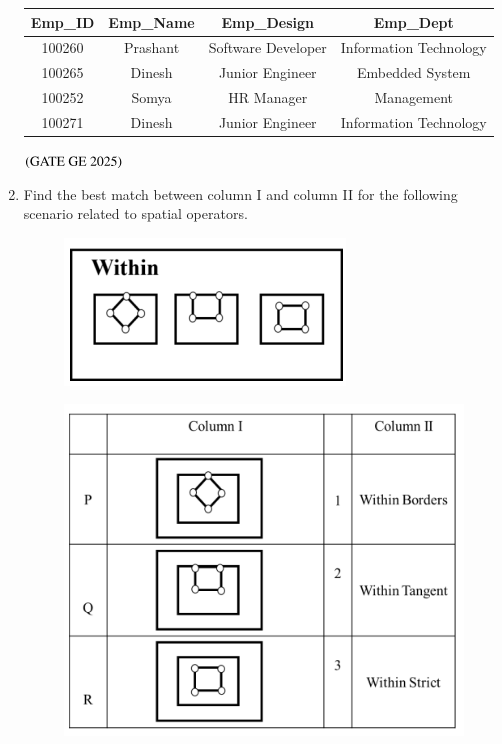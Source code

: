 \documentclass[journal,12pt,onecolumn]{IEEEtran}
\theoremstyle{remark}
\begin{document}
\begin{enumerate}
\begin{table}[h]
\centering
\begin{tabular}{|c|c|c|c|}
\hline
Emp\_ID & Emp\_Name & Emp\_Design & Emp\_Dept \\
\hline
100260 & Prashant & Software Developer & Information Technology \\
100265 & Dinesh & Junior Engineer & Embedded System \\
100252 & Somya & HR Manager & Management \\
100271 & Dinesh & Junior Engineer & Information Technology \\
\hline
\end{tabular}
\end{table}
\begin{enumerate}
\end{enumerate}
\hfill $\left(\text{GATE GE 2025}\right)$
\bigskip
\item Find the best match between column I and column II for the following scenario related to spatial operators.
\begin{figure}[H]
    \centering
    \includegraphics[width=0.2\columnwidth]{figs/fig4.png}
    \caption{}
    \label{figs:fig4}
\end{figure}
\begin{figure}[H]
    \centering
    \includegraphics[width=0.4\columnwidth]{figs/fig5.png}
    \caption{}
    \label{figs:fig5}
\end{figure}
\begin{enumerate}
\begin{multicols}{4}

\end{multicols}
\end{enumerate}
\end{enumerate}
\end{document}
